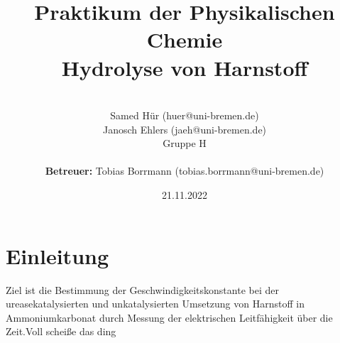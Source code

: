 \documentclass[a4paper, 11pt]{article}
\title{Praktikum der Physikalischen Chemie\\\large Hydrolyse von Harnstoff}
\author{\\Samed Hür (huer@uni-bremen.de)\\Janosch Ehlers (jaeh@uni-bremen.de)\\\small Gruppe H\\ \\ \textbf{Betreuer:} Tobias Borrmann (tobias.borrmann@uni-bremen.de)}
\date{21.11.2022}
\begin{document}
\maketitle
\thispagestyle{empty}
\newpage

\tableofcontents
\thispagestyle{empty}
\newpage
\clearpage
{} 

\section{Einleitung}
Ziel ist die Bestimmung der Geschwindigkeitskonstante bei der ureasekatalysierten und unkatalysierten Umsetzung von Harnstoff in Ammoniumkarbonat durch Messung der elektrischen Leitfähigkeit über die Zeit.\alert{Voll scheiße das ding}




\printbibliography
\end{document}
